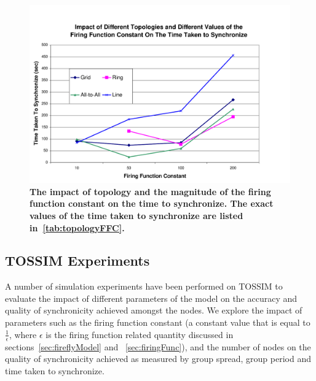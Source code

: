 


\begin{figure}
\begin{center}
\includegraphics[width=1.1\hsize]{./figures/topFFC.pdf}
\end{center}
\caption{{\small {\bf The impact of topology and the magnitude of the firing function constant on the time to synchronize.
The exact values of the time taken to synchronize are listed in~\ref{tab:topologyFFC}.}}} 
\label{fig:topFFC}
\end{figure}



\subsection{TOSSIM Experiments}
A number of simulation experiments have been performed on TOSSIM to evaluate
the impact of different parameters of the model on the accuracy and
quality of synchronicity achieved amongst the nodes.  We explore the impact
of parameters such as the firing function constant (a constant value that
is equal to $\frac{1}{\epsilon}$, where $\epsilon$ is the firing function
related quantity discussed in sections~\ref{sec:fireflyModel} and ~\ref{sec:firingFunc}), 
and the number of nodes on the quality of synchronicity achieved as 
measured by group spread, group period and time taken to synchronize.

